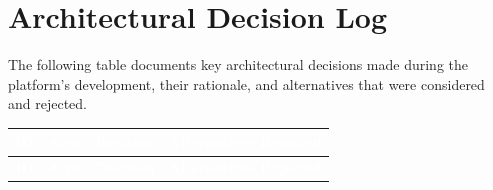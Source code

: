 \documentclass[12pt,a4paper,twoside]{report}
\begin{document}
\chapter{Architectural Decision Log}

The following table documents key architectural decisions made during the platform's development, their rationale, and alternatives that were considered and rejected.

\begin{longtable}{|l|l|X|X|}
\hline
\rowcolor{tabheader}
\textcolor{white}{\textbf{ID}} &
\textcolor{white}{\textbf{Area}} &
\textcolor{white}{\textbf{Decision}} &
\textcolor{white}{\textbf{Alternatives Rejected}} \\
\hline
\endfirsthead
\hline
\rowcolor{tabheader}
\textcolor{white}{\textbf{ID}} &
\textcolor{white}{\textbf{Area}} &
\textcolor{white}{\textbf{Decision}} &
\textcolor{white}{\textbf{Alternatives Rejected}} \\
\hline
\endhead


\end{longtable}
\end{document}
